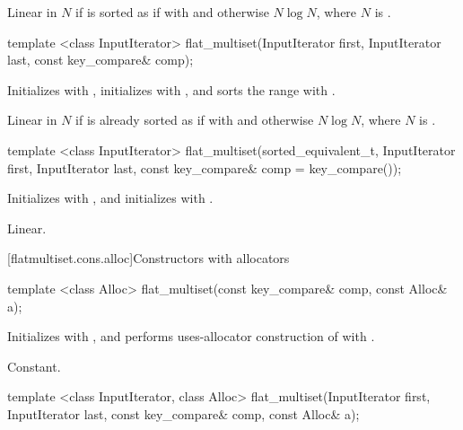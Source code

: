 \begin{codeblock}
\begin{codeblock}
\begin{codeblock}
\begin{addedblock}
\begin{itemdescr}
\pnum
\complexity
Linear in $N$ if  is sorted as if with  and
otherwise $N \log N$, where $N$ is .
\end{itemdescr}

%
\begin{itemdecl}
template <class InputIterator>
  flat_multiset(InputIterator first, InputIterator last, const key_compare& comp);
\end{itemdecl}

\begin{itemdescr}
\pnum
\effects Initializes  with , initializes 
with , and sorts the range 
with .

\pnum
\complexity
Linear in $N$ if  is already sorted as if with  and
otherwise $N \log N$, where $N$ is .
\end{itemdescr}

%
\begin{itemdecl}
template <class InputIterator>
  flat_multiset(sorted_equivalent_t, InputIterator first, InputIterator last,
                const key_compare& comp = key_compare());
\end{itemdecl}

\begin{itemdescr}
\pnum
\effects Initializes  with , and initializes
 with .

\pnum
\complexity
Linear.
\end{itemdescr}

[flatmultiset.cons.alloc]{Constructors with allocators}

%
\begin{itemdecl}
template <class Alloc>
  flat_multiset(const key_compare& comp, const Alloc& a);
\end{itemdecl}

\begin{itemdescr}
\pnum
\effects Initializes  with , and performs
uses-allocator construction of
 with .

\pnum
\complexity
Constant.
\end{itemdescr}

%
\begin{itemdecl}
template <class InputIterator, class Alloc>
  flat_multiset(InputIterator first, InputIterator last,
                const key_compare& comp, const Alloc& a);
\end{itemdecl}


\end{addedblock}
\end{codeblock}
\end{codeblock}
\end{codeblock}

